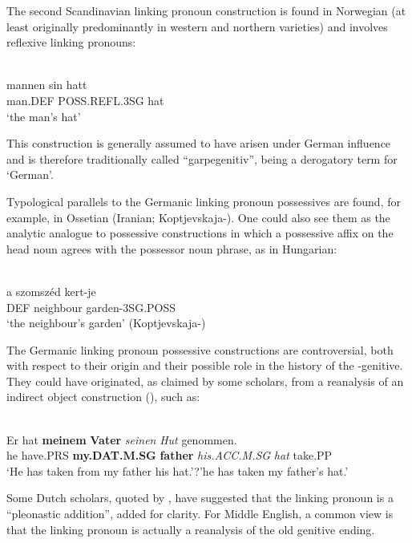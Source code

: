 The second Scandinavian linking pronoun construction is found in Norwegian (at least originally predominantly in western and northern varieties) and involves reflexive linking pronouns:

\ea\label{}
\\
\gll mannen  sin  hatt\\
man.DEF  POSS.REFL.3SG  hat\\
\glt ‘the man’s hat’
\z

This construction is generally assumed to have arisen under German influence and is therefore traditionally called “garpegenitiv”,  being a derogatory term for ‘German’.

Typological parallels to the Germanic linking pronoun possessives are found, for example, in Ossetian (Iranian; Koptjevskaja-\citet[669]{Tamm2003}). One could also see them as the analytic analogue to possessive constructions in which a possessive affix on the head noun agrees with the possessor noun phrase, as in Hungarian:

\ea\label{}
\\
\gll a  szomszéd  kert-je\\
DEF  neighbour  garden-3SG.POSS\\
\glt ‘the neighbour’s garden’ (Koptjevskaja-\citet[648]{Tamm2003}) 
\z

The Germanic linking pronoun possessive constructions are controversial, both with respect to their origin and their possible role in the history of the -genitive. They could have originated, as claimed by some scholars, from a reanalysis of an indirect object construction (\citet[638]{Behaghel1923}), such as:

\ea\label{}
\\
\gll Er  hat  \textbf{meinem} \textbf{Vater} \textit{seinen}\textit{  Hut}\textit{  }genommen.\\
he  have.PRS  \textbf{my.DAT.M.SG} \textbf{father} \textit{his.ACC.M.SG}\textit{  }\textit{hat}\textit{  }take.PP\\
\glt ‘He has taken from my father his hat.’?’he has taken my father’s hat.’
\z

Some Dutch scholars, quoted by \citet[58]{Norde1997}, have suggested that the linking pronoun is a “pleonastic addition”, added for clarity. For Middle English, a common view is that the linking pronoun  is actually a reanalysis of the old genitive ending.

